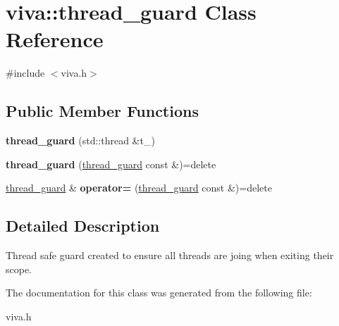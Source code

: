 \hypertarget{classviva_1_1thread__guard}{}\section{viva\+:\+:thread\+\_\+guard Class Reference}
\label{classviva_1_1thread__guard}


{\ttfamily \#include $<$viva.\+h$>$}

\subsection*{Public Member Functions}
\begin{DoxyCompactItemize}
\item 
{\bfseries thread\+\_\+guard} (std\+::thread \&t\+\_\+)\hypertarget{classviva_1_1thread__guard_a18469405edbe21f790ffced4f550e751}{}\label{classviva_1_1thread__guard_a18469405edbe21f790ffced4f550e751}

\item 
{\bfseries thread\+\_\+guard} (\hyperlink{classviva_1_1thread__guard}{thread\+\_\+guard} const \&)=delete\hypertarget{classviva_1_1thread__guard_a7f3d44c825af18f063b013f0623c2a48}{}\label{classviva_1_1thread__guard_a7f3d44c825af18f063b013f0623c2a48}

\item 
\hyperlink{classviva_1_1thread__guard}{thread\+\_\+guard} \& {\bfseries operator=} (\hyperlink{classviva_1_1thread__guard}{thread\+\_\+guard} const \&)=delete\hypertarget{classviva_1_1thread__guard_a001b0ac53f2bdc55ed74407dd43b1353}{}\label{classviva_1_1thread__guard_a001b0ac53f2bdc55ed74407dd43b1353}

\end{DoxyCompactItemize}


\subsection{Detailed Description}
Thread safe guard created to ensure all threads are joing when exiting their scope. 

The documentation for this class was generated from the following file\+:\begin{DoxyCompactItemize}
\item 
viva.\+h\end{DoxyCompactItemize}
